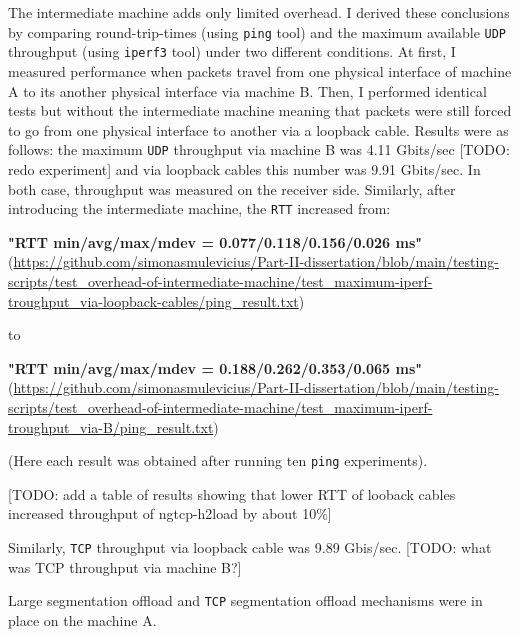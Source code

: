 \documentclass[12pt,a4paper,twoside,openright]{report}
\begin{document}
    The intermediate machine adds only limited overhead.
    I derived these conclusions by comparing round-trip-times (using \texttt{ping} tool) and the maximum available \texttt{UDP} throughput (using \texttt{iperf3} tool) under two different conditions.
    At first, I measured performance when packets travel from one physical interface of machine A to its another physical interface via machine B.
    Then, I performed identical tests but without the intermediate machine meaning that packets were still forced to go from one physical interface to another via a loopback cable.
    Results were as follows: the maximum \texttt{UDP} throughput via machine B was 4.11 Gbits/sec [TODO: redo experiment] and via loopback cables this number was 9.91 Gbits/sec.
    In both case, throughput was measured on the receiver side.
    Similarly, after introducing the intermediate machine, the \texttt{RTT} increased from:
    
    \textbf{"RTT min/avg/max/mdev = 0.077/0.118/0.156/0.026 ms"}\\
    (\url{https://github.com/simonasmulevicius/Part-II-dissertation/blob/main/testing-scripts/test_overhead-of-intermediate-machine/test_maximum-iperf-troughput_via-loopback-cables/ping_result.txt})
    
    to
    
    \textbf{"RTT min/avg/max/mdev = 0.188/0.262/0.353/0.065 ms"}\\
    (\url{https://github.com/simonasmulevicius/Part-II-dissertation/blob/main/testing-scripts/test_overhead-of-intermediate-machine/test_maximum-iperf-troughput_via-B/ping_result.txt})
    
    (Here each result was obtained after running ten \texttt{ping} experiments).
    
    [TODO: add a table of results showing that lower RTT of looback cables increased throughput of ngtcp-h2load by about 10\%]
    

    Similarly, \texttt{TCP} throughput via loopback cable was 9.89 Gbis/sec.
    [TODO: what was TCP throughput via machine B?]


    Large segmentation offload and \texttt{TCP} segmentation offload mechanisms were in place on the machine A. 
\end{document}
